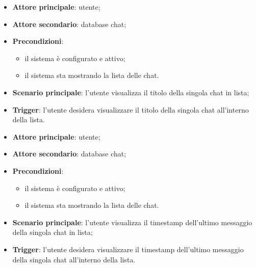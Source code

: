 \documentclass[10pt, a4paper]{article}
\begin{document}
    \begin{itemize}
        \item \textbf{Attore principale}: utente;
        \item \textbf{Attore secondario}: database chat;
        \item \textbf{Precondizioni}:
            \begin{itemize}
                \item il sistema è configurato e attivo;
                \item il sistema sta mostrando la lista delle chat.
            \end{itemize}
        \item \textbf{Scenario principale}: l'utente visualizza il titolo della singola chat in lista;
        \item \textbf{Trigger}: l’utente desidera visualizzare il titolo della singola chat all’interno della lista.
    \end{itemize}

    \begin{itemize}
        \item \textbf{Attore principale}: utente;
        \item \textbf{Attore secondario}: database chat;
        \item \textbf{Precondizioni}:
            \begin{itemize}
                \item il sistema è configurato e attivo;
                \item il sistema sta mostrando la lista delle chat.
            \end{itemize}
        \item \textbf{Scenario principale}: l'utente visualizza il timestamp dell'ultimo messaggio della singola chat in lista;
        \item \textbf{Trigger}: l’utente desidera visualizzare il timestamp dell'ultimo messaggio della singola chat all’interno della lista.
    \end{itemize}
\end{document}
